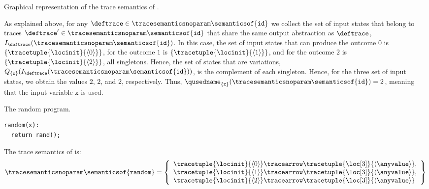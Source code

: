 \begin{example}
\begin{marginfigure}[*-4]
  \caption{Graphical representation of the trace semantics of .}
  \end{marginfigure}
  As explained above, for any $\deftrace\in \tracesemanticsnoparam\semanticsof{\texttt{id}}$ we collect the set of input states that belong to traces $\deftrace'\in\tracesemanticsnoparam\semanticsof{\texttt{id}}$ that share the same output abstraction as $\deftrace$, \cf{} $I_{\deftrace}(\tracesemanticsnoparam\semanticsof{\texttt{id}})$.
  In this case, the set of input states that can produce the outcome $0$ is $\{\tracetuple{\locinit}{\langle 0\rangle}\}$, for the outcome $1$ is $\{\tracetuple{\locinit}{\langle 1\rangle}\}$, and for the outcome $2$ is $\{\tracetuple{\locinit}{\langle 2\rangle}\}$, all singletons.
  Hence, the set of states that are variations, \cf{} $Q_{\{\texttt{x}\}}(I_{\deftrace}(\tracesemanticsnoparam\semanticsof{\texttt{id}}))$, is the complement of each singleton.
  Hence, for the three set of input states, we obtain the values $2$, $2$, and $2$, respectively.
  Thus, $\qusedname_{\{\texttt{x}\}}(\tracesemanticsnoparam\semanticsof{\texttt{id}})=2$, meaning that the input variable $\texttt{x}$ is used.

\begin{marginlisting}[*-3]
  \caption{The random program.}
  \vspace{15pt}
\begin{lstlisting}[style=mystyle,language=customPython]
random(x):
  return rand();
  \end{lstlisting}
\end{marginlisting}
  The trace semantics of  is:
  \begin{align*}
    \tracesemanticsnoparam\semanticsof{\texttt{random}}
    =
    \left\{
      \begin{array}{l}
        \tracetuple{\locinit}{\langle 0\rangle}\tracearrow\tracetuple{\loc[3]}{\langle \anyvalue\rangle}, \\
        \tracetuple{\locinit}{\langle 1\rangle}\tracearrow\tracetuple{\loc[3]}{\langle \anyvalue\rangle}, \\
        \tracetuple{\locinit}{\langle 2\rangle}\tracearrow\tracetuple{\loc[3]}{\langle \anyvalue\rangle}
      \end{array}
    \right\}
  \end{align*}


\end{example}

